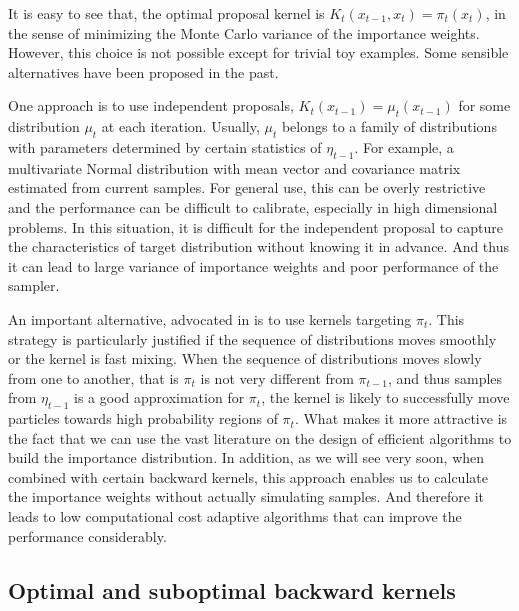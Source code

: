 It is easy to see that, the optimal proposal kernel is $K_t(x_{t-1}, x_t) =
\pi_t(x_t)$, in the sense of minimizing the Monte Carlo variance of the
importance weights. However, this choice is not possible except for trivial
toy examples. Some sensible alternatives have been proposed in the past.

One approach is to use independent proposals, $K_t(x_{t-1}) = \mu_t(x_{t-1})$
for some distribution $\mu_t$ at each iteration. Usually, $\mu_t$ belongs to a
family of distributions with parameters determined by certain statistics of
$\eta_{t-1}$. For example, a multivariate Normal distribution with mean vector
and covariance matrix estimated from current samples. For general use, this
can be overly restrictive and the performance can be difficult to calibrate,
especially in high dimensional problems. In this situation, it is difficult
for the independent proposal to capture the characteristics of target
distribution without knowing it in advance. And thus it can lead to large
variance of importance weights and poor performance of the sampler.

An important alternative, advocated in \cite{DelMoral:2006hc} is to use \mcmc
kernels targeting $\pi_t$. This strategy is particularly justified if the
sequence of distributions moves smoothly or the kernel is fast mixing. When the
sequence of distributions moves slowly from one to another, that is $\pi_t$
is not very different from $\pi_{t-1}$, and thus samples from $\eta_{t-1}$ is
a good approximation for $\pi_t$, the kernel is likely to successfully move
particles towards high probability regions of $\pi_t$. What makes it more
attractive is the fact that we can use the vast literature on the design of
efficient \mcmc algorithms to build the importance distribution. In addition,
as we will see very soon, when combined with certain backward kernels, this
approach enables us to calculate the importance weights without actually
simulating samples. And therefore it leads to low computational cost adaptive
algorithms that can improve the performance considerably.

\subsection{Optimal and suboptimal backward kernels}
\label{sub:Optimal and suboptimal backward kernels}


